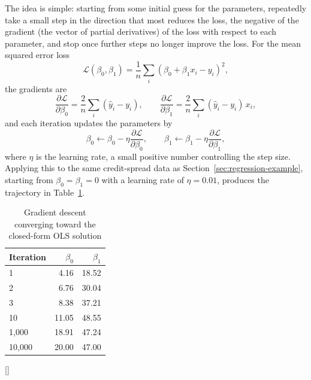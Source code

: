 \documentclass[../ai_in_finance]{subfiles}
\begin{document}
The idea is simple: starting from some initial guess for the parameters, repeatedly take a small step in the direction that most reduces the loss, the negative of the gradient (the vector of partial derivatives) of the loss with respect to each parameter, and stop once further steps no longer improve the loss. For the mean squared error loss
$$\mathcal{L}(\beta_0, \beta_1) = \frac{1}{n}\sum_i (\beta_0 + \beta_1 x_i - y_i)^2,$$
the gradients are
\begin{equation*}
\frac{\partial \mathcal{L}}{\partial \beta_0} = \frac{2}{n}\sum_i (\hat y_i - y_i), \qquad \frac{\partial \mathcal{L}}{\partial \beta_1} = \frac{2}{n}\sum_i (\hat y_i - y_i)\, x_i,
\end{equation*}
and each iteration updates the parameters by
\begin{equation*}
\beta_0 \leftarrow \beta_0 - \eta \frac{\partial \mathcal{L}}{\partial \beta_0}, \qquad \beta_1 \leftarrow \beta_1 - \eta \frac{\partial \mathcal{L}}{\partial \beta_1},
\end{equation*}
where $\eta$ is the learning rate, a small positive number controlling the step size. Applying this to the same credit-spread data as Section~\ref{sec:regression-example}, starting from $\beta_0=\beta_1=0$ with a learning rate of $\eta=0.01$, produces the trajectory in Table~\ref{tab:gradient_descent}.

\begin{table}[htbp]
\centering
\begin{lrbox}{\bookmeasuredbox}
\begin{tabular}{lrr}
\toprule
Iteration & $\beta_0$ & $\beta_1$ \\
\midrule
1      & 4.16  & 18.52 \\
2      & 6.76  & 30.04 \\
3      & 8.38  & 37.21 \\
10     & 11.05 & 48.55 \\
1{,}000   & 18.91 & 47.24 \\
10{,}000  & 20.00 & 47.00 \\
\bottomrule
\end{tabular}
\end{lrbox}
\ifdim\wd\bookmeasuredbox<0.65\linewidth
\setlength{\bookcapwidth}{0.65\linewidth}
\else
\setlength{\bookcapwidth}{\wd\bookmeasuredbox}
\fi
{}[\bookcapwidth]{
\usebox{\bookmeasuredbox}
}{
\caption{Gradient descent converging toward the closed-form OLS solution}
\label{tab:gradient_descent}
}
\end{table}
\end{document}
